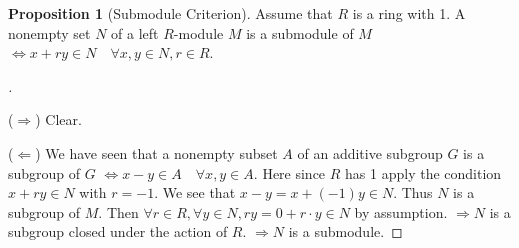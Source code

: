 \documentclass[12pt]{article}
\theoremstyle{definition}
\newtheorem{dfn}{Definition}
\newtheorem{prop}{Proposition}
\newenvironment{proofs}[1][\proofname]{%
  \begin{proof}[#1]$ $\par\nobreak\ignorespaces
}{%
  \end{proof}
}
\newcommand{\ZZ}{\mathbb Z}
\newcommand{\Ra}{\Rightarrow}
\newcommand{\La}{\Leftarrow}
\newcommand{\Lra}{\Leftrightarrow}
\begin{document}
\begin{prop}[Submodule Criterion]
	Assume that $R$ is a ring with 1.
	A nonempty set $N$ of a left $R$-module $M$ is a submodule of $M$ $\Lra x + ry \in N \quad \forall x, y \in N, r \in R$.
\end{prop}

\begin{proofs}
	($\Ra$) Clear.

	\par ($\La$) We have seen that a nonempty subset $A$ of an additive subgroup $G$ is a subgroup of $G$ $\Lra x - y \in A \quad \forall x, y \in A$.
	Here since $R$ has 1 apply the condition $x + ry \in N$ with $r = -1$.
	We see that $x - y = x + (-1) y \in N$.
	Thus $N$ is a subgroup of $M$.
	Then $\forall r \in R, \forall y \in N, ry = 0 + r \cdot y \in N$ by assumption.
	$\Ra N$ is a subgroup closed under the action of $R$.
	$\Ra N$ is a submodule.
\end{proofs}






\end{document}
